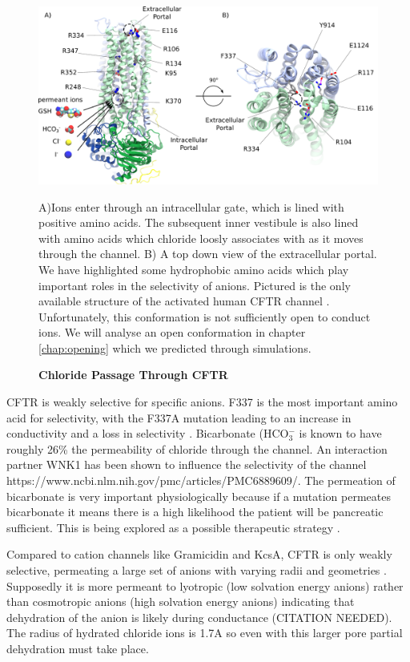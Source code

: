 \begin{figure}
	\begin{center}
	\includegraphics[width=\textwidth]{figures/chloride_passage_figure.pdf}
	\end{center}
	\label{chloride_passage}
	\captionsetup{singlelinecheck = false, justification=raggedright}
	\caption[Chlrodie Passage through CFTR] {\textbf{Chloride Passage Through CFTR}}{A)Ions enter through an intracellular gate, which is lined with positive amino acids. The subsequent inner vestibule is also lined with amino acids which chloride loosly associates with as it moves through the channel. B) A top down view of the extracellular portal. We have highlighted some hydrophobic amino acids which play important roles in the selectivity of anions. Pictured is the only available structure of the activated human CFTR channel \cite{zhang2018}. Unfortunately, this conformation is not sufficiently open to conduct ions. We will analyse an open conformation in chapter \ref{chap:opening} which we predicted through simulations.} 

\end{figure}
CFTR is weakly selective for specific anions. F337 is the most important amino acid for selectivity, with the F337A mutation leading to an increase in conductivity and a loss in selectivity \cite{wei2016}. Bicarbonate (HCO$_3^-$ is known to have roughly 26\% the permeability of chloride through the channel. An interaction partner WNK1 has been shown to influence the selectivity of the channel https://www.ncbi.nlm.nih.gov/pmc/articles/PMC6889609/. The permeation of bicarbonate is very important physiologically because if a mutation permeates bicarbonate it means there is a high likelihood the patient will be pancreatic sufficient. This is being explored as a possible therapeutic strategy \cite{ferrera2021}. 

Compared to cation channels like Gramicidin and KcsA, CFTR is only weakly selective, permeating a large set of anions with varying radii and geometries \cite{}. Supposedly it is more permeant to lyotropic (low solvation energy anions) rather than cosmotropic anions (high solvation energy anions) indicating that dehydration of the anion is likely during conductance (CITATION NEEDED). The radius of hydrated chloride ions is 1.7A \cite{yang2002} so even with this larger pore partial dehydration must take place. 

